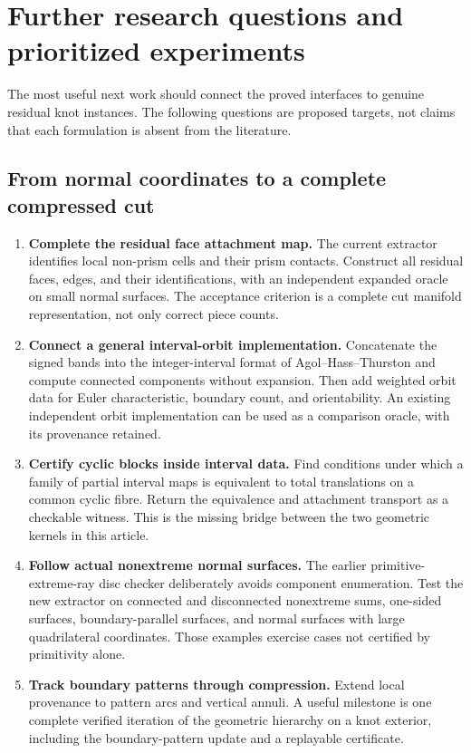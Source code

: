 \section{Further research questions and prioritized experiments}
\label{sec:research}

The most useful next work should connect the proved interfaces to
genuine residual knot instances. The following questions are proposed
targets, not claims that each formulation is absent from the literature.

\subsection{From normal coordinates to a complete compressed cut}

\begin{enumerate}
\item \textbf{Complete the residual face attachment map.} The current
extractor identifies local non-prism cells and their prism contacts.
Construct all residual faces, edges, and their identifications, with an
independent expanded oracle on small normal surfaces. The acceptance
criterion is a complete cut manifold representation, not only correct
piece counts.
\item \textbf{Connect a general interval-orbit implementation.} Concatenate
the signed bands into the integer-interval format of
Agol--Hass--Thurston and compute connected components without expansion.
Then add weighted orbit data for Euler characteristic, boundary count,
and orientability. An existing independent orbit implementation can be
used as a comparison oracle, with its provenance retained.
\item \textbf{Certify cyclic blocks inside interval data.} Find conditions
under which a family of partial interval maps is equivalent to total
translations on a common cyclic fibre. Return the equivalence and
attachment transport as a checkable witness. This is the missing bridge
between the two geometric kernels in this article.
\item \textbf{Follow actual nonextreme normal surfaces.} The earlier
primitive-extreme-ray disc checker deliberately avoids component
enumeration. Test the new extractor on connected and disconnected
nonextreme sums, one-sided surfaces, boundary-parallel surfaces, and
normal surfaces with large quadrilateral coordinates. Those examples
exercise cases not certified by primitivity alone.
\item \textbf{Track boundary patterns through compression.} Extend local
provenance to pattern arcs and vertical annuli. A useful milestone is one
complete verified iteration of the geometric hierarchy on a knot
exterior, including the boundary-pattern update and a replayable
certificate.
\end{enumerate}

